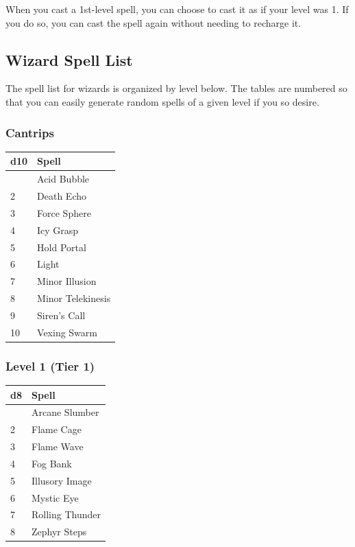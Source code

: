 \documentclass[12pt,letterpaper,twocolumn,openany,nodeprecatedcode,bg=none]{dndbook}
\begin{document}
When you cast a 1st-level spell, you can choose to cast it as if your
level was 1. If you do so, you can cast the spell again without needing
to recharge it.

\onecolumn

\subsection{Wizard Spell List}\label{wizard-spell-list}

The spell list for wizards is organized by level below. The tables are
numbered so that you can easily generate random spells of a given level
if you so desire.

\subsubsection{Cantrips}\label{cantrips}

\begin{longtable}[]{@{}ll@{}}
\toprule\noalign{}
d10 & Spell \\
\midrule\noalign{}
\endhead
\bottomrule\noalign{}
\endlastfoot
1 & Acid Bubble \\
2 & Death Echo \\
3 & Force Sphere \\
4 & Icy Grasp \\
5 & Hold Portal \\
6 & Light \\
7 & Minor Illusion \\
8 & Minor Telekinesis \\
9 & Siren's Call \\
10 & Vexing Swarm \\
\end{longtable}

\subsubsection{Level 1 (Tier 1)}\label{level-1-tier-1}

\begin{longtable}[]{@{}ll@{}}
\toprule\noalign{}
d8 & Spell \\
\midrule\noalign{}
\endhead
\bottomrule\noalign{}
\endlastfoot
1 & Arcane Slumber \\
2 & Flame Cage \\
3 & Flame Wave \\
4 & Fog Bank \\
5 & Illusory Image \\
6 & Mystic Eye \\
7 & Rolling Thunder \\
8 & Zephyr Steps \\
\end{longtable}
\end{document}
